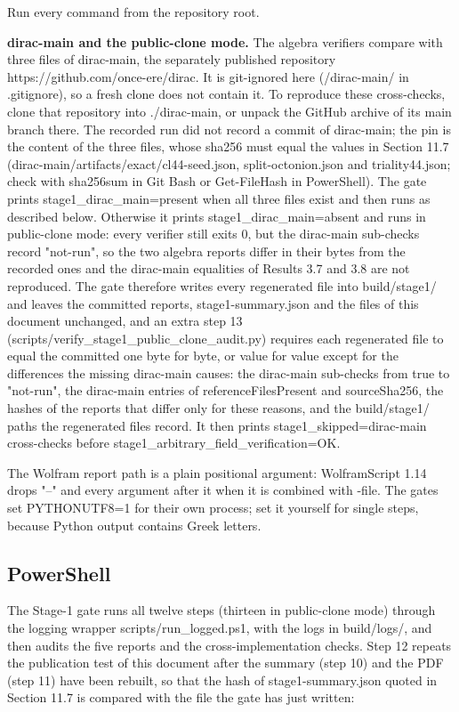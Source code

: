 \documentclass[11pt]{article}
\begin{document}
Run every command from the repository root.

\textbf{dirac-main and the public-clone mode.} The algebra verifiers compare with three files of dirac-main, the separately published repository https://github.com/once-ere/dirac. It is git-ignored here (/dirac-main/ in .gitignore), so a fresh clone does not contain it. To reproduce these cross-checks, clone that repository into ./dirac-main, or unpack the GitHub archive of its main branch there. The recorded run did not record a commit of dirac-main; the pin is the content of the three files, whose sha256 must equal the values in Section 11.7 (dirac-main/artifacts/exact/cl44-seed.json, split-octonion.json and triality44.json; check with sha256sum in Git Bash or Get-FileHash in PowerShell). The gate prints stage1\_dirac\_main=present when all three files exist and then runs as described below. Otherwise it prints stage1\_dirac\_main=absent and runs in public-clone mode: every verifier still exits 0, but the dirac-main sub-checks record "not-run", so the two algebra reports differ in their bytes from the recorded ones and the dirac-main equalities of Results 3.7 and 3.8 are not reproduced. The gate therefore writes every regenerated file into build/stage1/ and leaves the committed reports, stage1-summary.json and the files of this document unchanged, and an extra step 13 (scripts/verify\_stage1\_public\_clone\_audit.py) requires each regenerated file to equal the committed one byte for byte, or value for value except for the differences the missing dirac-main causes: the dirac-main sub-checks from true to "not-run", the dirac-main entries of referenceFilesPresent and sourceSha256, the hashes of the reports that differ only for these reasons, and the build/stage1/ paths the regenerated files record. It then prints stage1\_skipped=dirac-main cross-checks before stage1\_arbitrary\_field\_verification=OK.

The Wolfram report path is a plain positional argument: WolframScript 1.14 drops "--" and every argument after it when it is combined with -file. The gates set PYTHONUTF8=1 for their own process; set it yourself for single steps, because Python output contains Greek letters.

\subsection{PowerShell}

The Stage-1 gate runs all twelve steps (thirteen in public-clone mode) through the logging wrapper scripts/run\_logged.ps1, with the logs in build/logs/, and then audits the five reports and the cross-implementation checks. Step 12 repeats the publication test of this document after the summary (step 10) and the PDF (step 11) have been rebuilt, so that the hash of stage1-summary.json quoted in Section 11.7 is compared with the file the gate has just written:
\end{document}
